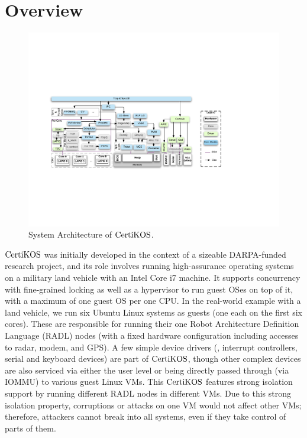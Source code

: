 \section{Overview}
\label{chapter:certikos:sec:overview}

\begin{figure}
\includegraphics[width=\textwidth]{figs/certikos/sysarch}
\caption{System Architecture of $\mathrm{CertiKOS}$.}
\label{fig:chapter:certikos:system-architecture-of-certikos}
\end{figure}


$\mathrm{CertiKOS}$ was initially developed in the context of a sizeable DARPA-funded research project, 
and its role involves running high-assurance operating systems on a military land vehicle with an Intel Core i7 machine. 
It supports concurrency with fine-grained locking as well as a hypervisor to run guest OSes on top of it, 
with a maximum of one guest OS per one CPU. 
In the real-world example with a land vehicle, we run six Ubuntu Linux systems as guests (one each on the first six cores). 
These are responsible for running their one Robot Architecture Definition Language (RADL) 
nodes (with a fixed hardware configuration including accesses to radar, modem, and GPS). 
A few simple device drivers (\eg, interrupt controllers, serial and keyboard devices) are part of $\mathrm{CertiKOS}$, though other complex devices are also serviced via either the user level or being directly passed through (via IOMMU) to various guest Linux VMs. 
This $\mathrm{CertiKOS}$ features strong isolation support by running different RADL nodes in different VMs. 
Due to this strong isolation property, corruptions or attacks on one VM would not affect other VMs; therefore, attackers cannot break into all systems, even if they take control of parts of them.


